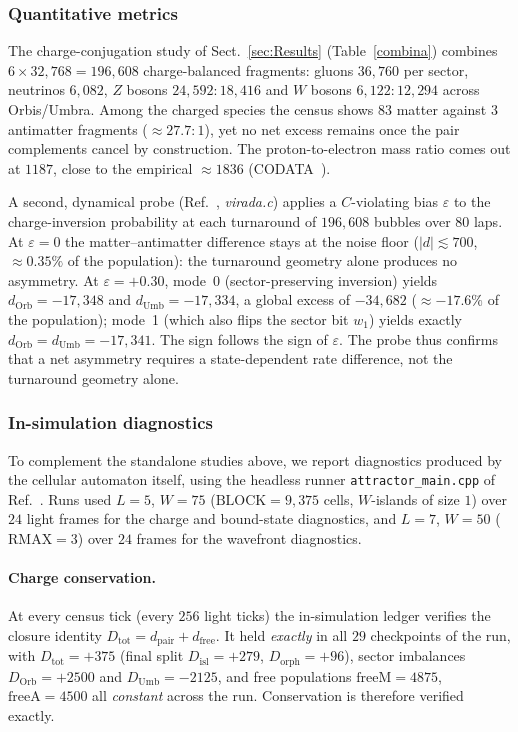\documentclass{ijuc}
\begin{document}
\subsubsection{Quantitative metrics}

The charge-conjugation study of Sect.~\ref{sec:Results} (Table~\ref{combina}) combines $6\times32{,}768=196{,}608$ charge-balanced fragments: gluons $36{,}760$ per sector, neutrinos $6{,}082$, $Z$ bosons $24{,}592{:}18{,}416$ and $W$ bosons $6{,}122{:}12{,}294$ across Orbis/Umbra.  Among the charged species the census shows $83$ matter against $3$ antimatter fragments ($\approx27.7{:}1$), yet no net excess remains once the pair complements cancel by construction.  The proton-to-electron mass ratio comes out at $1187$, close to the empirical $\approx1836$ (CODATA~\cite{codata}).

A second, dynamical probe (Ref.~\cite{af_neto}, \emph{virada.c}) applies a $C$-violating bias $\varepsilon$ to the charge-inversion probability at each turnaround of $196{,}608$ bubbles over $80$ laps.  At $\varepsilon=0$ the matter--antimatter difference stays at the noise floor ($|d|\lesssim700$, $\approx0.35\%$ of the population): the turnaround geometry alone produces no asymmetry.  At $\varepsilon=+0.30$, mode~0 (sector-preserving inversion) yields $d_{\mathrm{Orb}}=-17{,}348$ and $d_{\mathrm{Umb}}=-17{,}334$, a global excess of $-34{,}682$ ($\approx-17.6\%$ of the population); mode~1 (which also flips the sector bit $w_1$) yields exactly $d_{\mathrm{Orb}}=d_{\mathrm{Umb}}=-17{,}341$.  The sign follows the sign of $\varepsilon$.  The probe thus confirms that a net asymmetry requires a state-dependent rate difference, not the turnaround geometry alone.

\subsubsection{In-simulation diagnostics}

To complement the standalone studies above, we report diagnostics produced by the cellular automaton itself, using the headless runner \texttt{attractor\_main.cpp} of Ref.~\cite{af_neto}.  Runs used $L=5$, $W=75$ ($\mathrm{BLOCK}=9{,}375$ cells, $W$-islands of size $1$) over $24$ light frames for the charge and bound-state diagnostics, and $L=7$, $W=50$ ($\mathrm{RMAX}=3$) over $24$ frames for the wavefront diagnostics.

\paragraph{Charge conservation.} At every census tick (every $256$ light ticks) the in-simulation ledger verifies the closure identity $D_{\mathrm{tot}}=d_{\mathrm{pair}}+d_{\mathrm{free}}$.  It held \emph{exactly} in all $29$ checkpoints of the run, with $D_{\mathrm{tot}}=+375$ (final split $D_{\mathrm{isl}}=+279$, $D_{\mathrm{orph}}=+96$), sector imbalances $D_{\mathrm{Orb}}=+2500$ and $D_{\mathrm{Umb}}=-2125$, and free populations $\mathrm{freeM}=4875$, $\mathrm{freeA}=4500$ all \emph{constant} across the run.  Conservation is therefore verified exactly.
\end{document}

